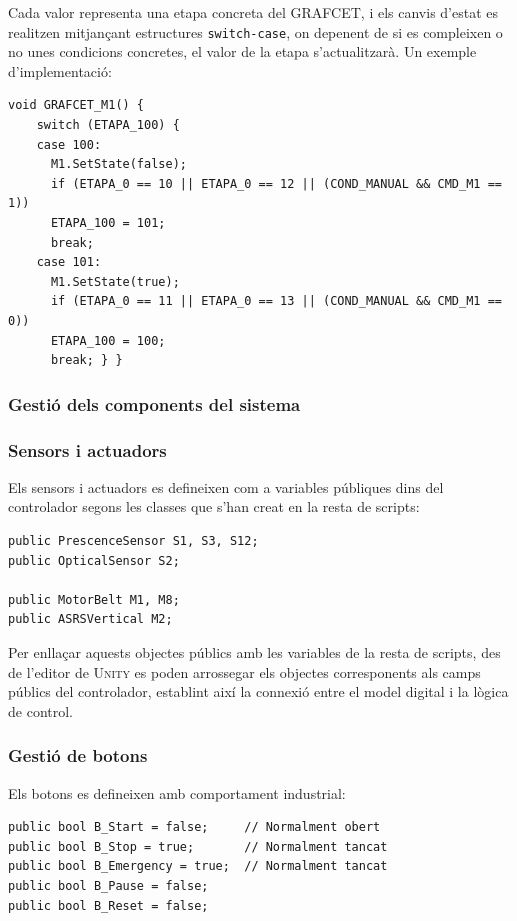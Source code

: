 \documentclass[a4paper,11pt,DIV=13,headings=normal,abstract=true,twoside=semi]{article}
\newcommand{\acro}[1]{\textsc{#1}}
\begin{document}
Cada valor representa una etapa concreta del \acro{GRAFCET}, i els canvis d'estat es realitzen mitjançant estructures \texttt{switch-case}, on depenent de si es compleixen o no unes condicions concretes, el valor de la etapa s'actualitzarà. Un exemple d'implementació: 

\begin{lstlisting}[style=simple]
  void GRAFCET_M1() {
    switch (ETAPA_100) {
    case 100: 
      M1.SetState(false);
      if (ETAPA_0 == 10 || ETAPA_0 == 12 || (COND_MANUAL && CMD_M1 == 1)) 
      ETAPA_100 = 101;
      break;
    case 101: 
      M1.SetState(true);
      if (ETAPA_0 == 11 || ETAPA_0 == 13 || (COND_MANUAL && CMD_M1 == 0)) 
      ETAPA_100 = 100;
      break; } }
\end{lstlisting}

\subsubsection{Gestió dels components del sistema}
\subsubsection*{Sensors i actuadors}

Els sensors i actuadors es defineixen com a variables públiques dins del controlador segons les classes que s'han creat en la resta de scripts:

\begin{lstlisting}[style=simple]
public PrescenceSensor S1, S3, S12;
public OpticalSensor S2;

public MotorBelt M1, M8;
public ASRSVertical M2;
\end{lstlisting}

Per enllaçar aquests objectes públics amb les variables de la resta de scripts, des de l'editor de \acro{Unity} es poden arrossegar els objectes corresponents als camps públics del controlador, establint així la connexió entre el model digital i la lògica de control.


\subsubsection*{Gestió de botons}

Els botons es defineixen amb comportament industrial:

\begin{lstlisting}[style=simple]
public bool B_Start = false;     // Normalment obert
public bool B_Stop = true;       // Normalment tancat
public bool B_Emergency = true;  // Normalment tancat
public bool B_Pause = false;
public bool B_Reset = false; 
\end{lstlisting}
\end{document}
